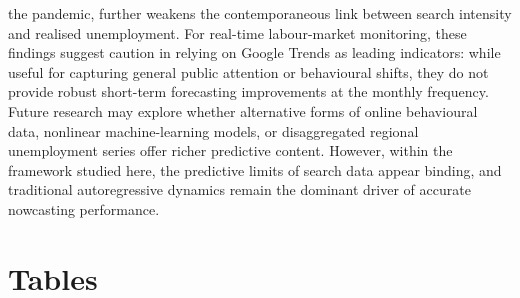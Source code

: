\documentclass[12pt,a4paper]{article}
\begin{document}
the pandemic, further weakens the contemporaneous link between search intensity
and realised unemployment. For real-time labour-market monitoring, these findings
suggest caution in relying on Google Trends as leading indicators: while useful
for capturing general public attention or behavioural shifts, they do not provide
robust short-term forecasting improvements at the monthly frequency.\\
Future research may explore whether alternative forms of online behavioural data,
nonlinear machine-learning models, or disaggregated regional unemployment series
offer richer predictive content. However, within the framework studied here, the
predictive limits of search data appear binding, and traditional autoregressive
dynamics remain the dominant driver of accurate nowcasting performance.






\newpage

\section{Tables}
\end{document}
